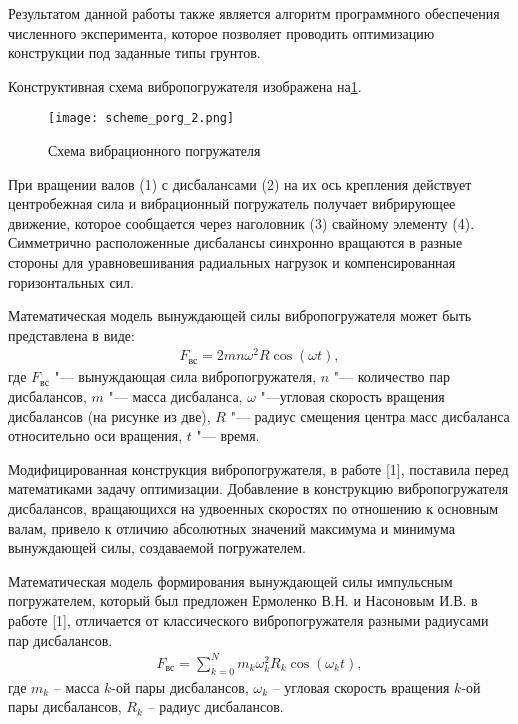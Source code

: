 Результатом данной работы также является алгоритм программного обеспечения численного эксперимента, которое позволяет проводить оптимизацию конструкции под заданные типы грунтов.

Конструктивная схема вибропогружателя изображена на \ref{fig:scheme_porg}.
\begin{figure}[h]
    \centering
    \texttt{[image: scheme\_porg\_2.png]}
    \caption{Схема вибрационного погружателя}
    \label{fig:scheme_porg}
\end{figure}

При вращении валов (1) с дисбалансами (2) на их ось крепления действует центробежная сила и вибрационный погружатель получает вибрирующее движение,
которое сообщается через наголовник (3) свайному элементу (4). Симметрично расположенные дисбалансы синхронно вращаются в разные стороны для уравновешивания радиальных нагрузок и компенсированная горизонтальных сил.

Математическая модель вынуждающей силы вибропогружателя может быть представлена в виде:
\begin{equation}\label{eq:centrifugal}
    \begin{gathered}
        F_{\textrm{вс}} = 2mn\omega^2 R\cos(\omega t),
    \end{gathered}
\end{equation}
\noindent где $F_{\textrm{вс}}$ "--- вынуждающая сила вибропогружателя, $n$ "--- количество пар дисбалансов, $m$ "--- масса дисбаланса, $\omega$ "---угловая скорость вращения дисбалансов (на рисунке из две),
$R$ "--- радиус смещения центра масс дисбаланса относительно оси вращения, $t$ "--- время.

Модифицированная конструкция вибропогружателя,  в работе [1], поставила перед математиками задачу оптимизации.
Добавление в конструкцию вибропогружателя дисбалансов, вращающихся на удвоенных скоростях по отношению к основным валам, привело к отличию абсолютных
значений максимума и минимума вынуждающей силы, создаваемой погружателем.

Математическая модель формирования вынуждающей силы импульсным погружателем, который был предложен Ермоленко В.Н. и Насоновым И.В. в работе [1], отличается от классического вибропогружателя разными радиусами пар дисбалансов.
\begin{equation}\label{eq:short_harmonic_sum}
    \begin{gathered}
        F_{\textrm{вс}} = \sum\limits_{k = 0}^N m_k \omega_k^2 R_k \cos(\omega_k t),
    \end{gathered}
\end{equation}
\noindent где $m_k$ – масса $k$-ой пары дисбалансов, $\omega_k$ – угловая скорость вращения $k$-ой пары дисбалансов, $R_k$ – радиус дисбалансов.


